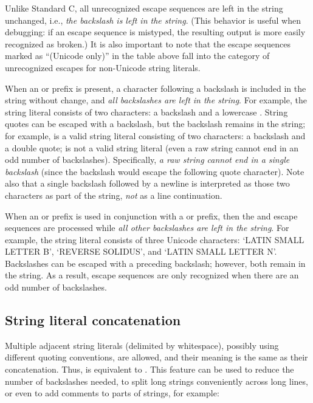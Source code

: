 Unlike Standard C,
all unrecognized escape sequences are left in the string unchanged,
i.e., \emph{the backslash is left in the string}.  (This behavior is
useful when debugging: if an escape sequence is mistyped, the
resulting output is more easily recognized as broken.)  It is also
important to note that the escape sequences marked as ``(Unicode
only)'' in the table above fall into the category of unrecognized
escapes for non-Unicode string literals.

When an  or  prefix is present, a character
following a backslash is included in the string without change, and \emph{all
backslashes are left in the string}.  For example, the string literal
 consists of two characters: a backslash and a lowercase
.  String quotes can be escaped with a backslash, but the
backslash remains in the string; for example,  is a valid string
literal consisting of two characters: a backslash and a double quote;
 is not a valid string literal (even a raw string cannot
end in an odd number of backslashes).  Specifically, \emph{a raw
string cannot end in a single backslash} (since the backslash would
escape the following quote character).  Note also that a single
backslash followed by a newline is interpreted as those two characters
as part of the string, \emph{not} as a line continuation.

When an  or  prefix is used in conjunction
with a  or  prefix, then the 
and  escape sequences are processed while 
\emph{all other backslashes are left in the string}.
For example, the string literal
 consists of three Unicode characters: `LATIN
SMALL LETTER B', `REVERSE SOLIDUS', and `LATIN SMALL LETTER N'.
Backslashes can be escaped with a preceding backslash; however, both
remain in the string.  As a result,  escape sequences
are only recognized when there are an odd number of backslashes.

\subsection{String literal concatenation\label{string-catenation}}

Multiple adjacent string literals (delimited by whitespace), possibly
using different quoting conventions, are allowed, and their meaning is
the same as their concatenation.  Thus,  is
equivalent to .  This feature can be used to reduce
the number of backslashes needed, to split long strings conveniently
across long lines, or even to add comments to parts of strings, for
example:

